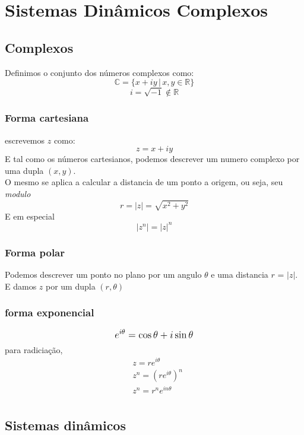 \chapter{Sistemas Dinâmicos Complexos}

\section{Complexos}

Definimos o conjunto dos números complexos como:
\[
    \mathbb{C} = \{ x + iy\, |\, x,y \in \mathbb{R} \} 
\]
\[
    i = \sqrt{-1} \notin \mathbb{R}
\]

\subsection{Forma cartesiana}

escrevemos \(z\) como:
\[
    z = x + iy
\]
E tal como os números cartesianos, podemos descrever um numero complexo por uma dupla \((x,y)\).\\
O mesmo se aplica a calcular a distancia de um ponto a origem, ou seja, seu \textit{modulo}
\[
    r = |z| = \sqrt{x^2 + y^2}
\]
E em especial
\[
    |z^n| =  |z|^n
\]
\subsection{Forma polar}

Podemos descrever um ponto no plano por um angulo \(\theta\) e uma distancia \(r\) = \(|z|\). E damos \(z\) por um dupla \((r, \theta)\) 

\subsection{forma exponencial}

\begin{equation}
    \mathlarger{e^{i\theta} = \cos{\theta} + i\sin{\theta}}
\end{equation}
para radiciação,
\begin{align*}
    &z = re^{i \theta} \\
    &z^n = (re^{i \theta})^n\\
    &z^n = r^n e^{i n \theta} \\
\end{align*}


\section{Sistemas dinâmicos}
